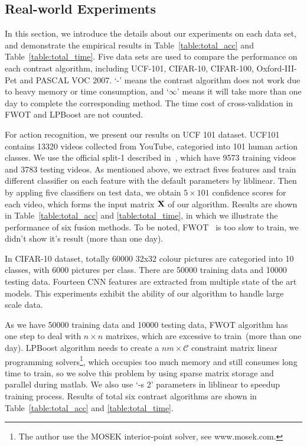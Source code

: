 \documentclass[letterpaper]{article}
\def\calC{{\mathcal{C}}}
\def\bX{{\bf X}}
\def\bX{{\bf X}}
\begin{document}
\subsection{Real-world Experiments}

In this section, we introduce the details about our experiments on each data set,
and demonstrate the empirical results in Table~\ref{table:total_acc} and Table~\ref{table:total_time}.
Five data sets are used to compare the performance on each contrast algorithm, including UCF-101, CIFAR-10, CIFAR-100, Oxford-III-Pet and PASCAL VOC 2007.
`-' means the contrast algorithm does not work due to heavy memory or time consumption, and `$\infty$' means it will take more than one day to complete the corresponding method. The time cost of cross-validation in FWOT and LPBoost are not counted.

For action recognition, we present our results on UCF 101 dataset. 
UCF101 contains 13320 videos collected from YouTube, categoried into 101 human action classes. 
We use the official split-1 described in~\cite{soomro2012ucf101}, which have 9573 training videos and 3783 testing videos. 
As mentioned above, we extract fives features and train different classifier on each feature with the default parameters by liblinear.
Then by appling five classifiers on test data, we obtain $5 \times 101$ confidence scores for each video, which forms the input matrix $\bX$ of our algorithm. 
Results are shown in Table~\ref{table:total_acc} and \ref{table:total_time}, in which we illustrate the performance of six fusion methods. 
To be noted, FWOT~\cite{xuiccv2013feature} is too slow to train, we didn't show it's result (more than one day).



In CIFAR-10 dataset, totally 60000 32x32 colour pictures are categoried into 10 classes, with 6000 pictures per class. 
There are 50000 training data and 10000 testing data. 
Fourteen CNN features are extracted from multiple state of the art models. 
This experiments exhibit the ability of our algorithm to handle large scale data.

As we have 50000 training data and 10000 testing data,
FWOT algorithm has one step to deal with $n\times n$ matrixes, which are excessive to train~(more than one day). 
LPBoost algorithm needs to create a $nm\times \calC$ constraint matrix linear programming solvers\footnote{The author use the MOSEK interior-point solver, see www.mosek.com.},
which occupies too much memory and still consumes long time to train, so we solve this problem by using sparse matrix storage and parallel during matlab. 
We also use `-s 2' parameters in liblinear to speedup training process. Results of total six contrast algorithms are shown in Table~\ref{table:total_acc} and \ref{table:total_time}.
\end{document}
